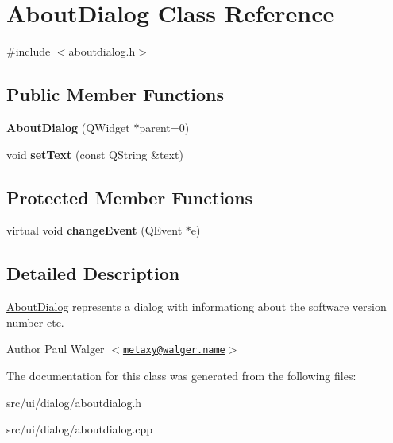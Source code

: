 \hypertarget{classAboutDialog}{
\section{AboutDialog Class Reference}
\label{classAboutDialog}
}


{\ttfamily \#include $<$aboutdialog.h$>$}

\subsection*{Public Member Functions}
\begin{DoxyCompactItemize}
\item 
\hypertarget{classAboutDialog_ad96fc2ce8de7568ace543b7c69c71c56}{
{\bfseries AboutDialog} (QWidget $\ast$parent=0)}
\label{classAboutDialog_ad96fc2ce8de7568ace543b7c69c71c56}

\item 
\hypertarget{classAboutDialog_a42c59fd60ea452b58e1126416e63c920}{
void {\bfseries setText} (const QString \&text)}
\label{classAboutDialog_a42c59fd60ea452b58e1126416e63c920}

\end{DoxyCompactItemize}
\subsection*{Protected Member Functions}
\begin{DoxyCompactItemize}
\item 
\hypertarget{classAboutDialog_abac18da2759d1b4bb0e5bca856b0efcf}{
virtual void {\bfseries changeEvent} (QEvent $\ast$e)}
\label{classAboutDialog_abac18da2759d1b4bb0e5bca856b0efcf}

\end{DoxyCompactItemize}


\subsection{Detailed Description}
\hyperlink{classAboutDialog}{AboutDialog} represents a dialog with informationg about the software version number etc.

\begin{DoxyAuthor}{Author}
Paul Walger $<$\href{mailto:metaxy@walger.name}{\tt metaxy@walger.name}$>$ 
\end{DoxyAuthor}


The documentation for this class was generated from the following files:\begin{DoxyCompactItemize}
\item 
src/ui/dialog/aboutdialog.h\item 
src/ui/dialog/aboutdialog.cpp\end{DoxyCompactItemize}
